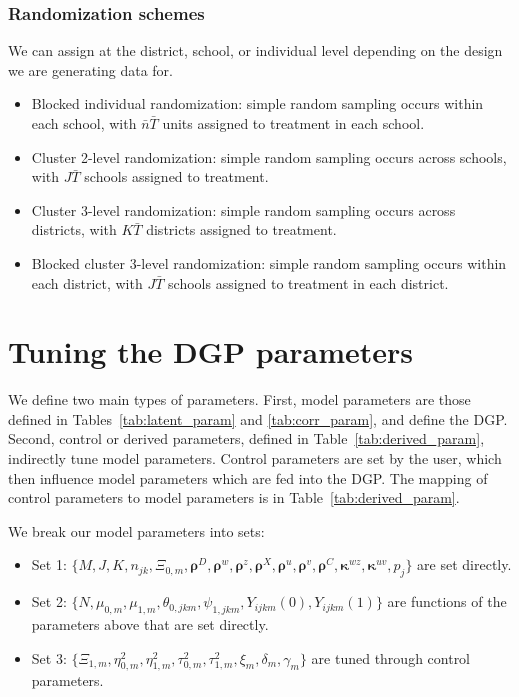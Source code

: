 \documentclass[12pt]{article}
\newcommand\mb[1]{\boldsymbol{#1}}
\begin{document}
\subsubsection{Randomization schemes}

We can assign at the district, school, or individual level depending on the design we are generating data for.

\begin{itemize}
\item Blocked individual randomization: simple random sampling occurs within each school, with $\bar{n}\bar{T}$ units assigned to treatment in each school.
\item Cluster 2-level randomization: simple random sampling occurs across schools, with $J \bar{T}$ schools assigned to treatment.
\item Cluster 3-level randomization: simple random sampling occurs across districts, with $K \bar{T}$ districts assigned to treatment.
\item Blocked cluster 3-level randomization: simple random sampling occurs within each district, with $J\bar{T}$ schools assigned to treatment in each district.
\end{itemize}


\section{Tuning the DGP parameters}
\label{sec:tune}

We define two main types of parameters.
First, model parameters are those defined in Tables~\ref{tab:latent_param} and \ref{tab:corr_param}, and define the DGP.
Second, control or derived parameters, defined in Table~\ref{tab:derived_param}, indirectly tune model parameters.
Control parameters are set by the user, which then influence model parameters which are fed into the DGP.
The mapping of control parameters to model parameters is in Table~\ref{tab:derived_param}.

We break our model parameters into sets:
\begin{itemize}
\item Set 1: $\{M, J, K, n_{jk}, \Xi_{0,m}, \mb{\rho}^D, \mb{\rho}^w, \mb{\rho}^z, \mb{\rho}^X, \mb{\rho}^u, \mb{\rho}^v, \mb{\rho}^C, \boldsymbol{\kappa}^{wz}, \boldsymbol{\kappa}^{uv}, p_j\}$ are set directly.
\item Set 2: $\{N, \mu_{0,m}, \mu_{1,m}, \theta_{0,jkm}, \psi_{1,jkm}, Y_{ijkm}(0), Y_{ijkm}(1) \}$ are functions of the parameters above that are set directly.
\item Set 3: $\{\Xi_{1,m}, \eta^2_{0,m}, \eta^2_{1,m}, \tau^2_{0,m}, \tau^2_{1,m}, \xi_m, \delta_m, \gamma_m\}$ are tuned through control parameters.
\end{itemize}
\end{document}
